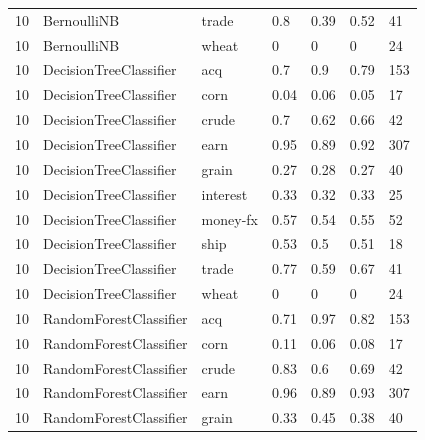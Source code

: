 \documentclass{article}
\begin{document}
\begin{table}[h]
\begin{tabular}{lllllll}
10            & BernoulliNB            & trade           & 0.8                & 0.39            & 0.52              & 41               \\
10            & BernoulliNB            & wheat           & 0                  & 0               & 0                 & 24               \\
10            & DecisionTreeClassifier & acq             & 0.7                & 0.9             & 0.79              & 153              \\
10            & DecisionTreeClassifier & corn            & 0.04               & 0.06            & 0.05              & 17               \\
10            & DecisionTreeClassifier & crude           & 0.7                & 0.62            & 0.66              & 42               \\
10            & DecisionTreeClassifier & earn            & 0.95               & 0.89            & 0.92              & 307              \\
10            & DecisionTreeClassifier & grain           & 0.27               & 0.28            & 0.27              & 40               \\
10            & DecisionTreeClassifier & interest        & 0.33               & 0.32            & 0.33              & 25               \\
10            & DecisionTreeClassifier & money-fx        & 0.57               & 0.54            & 0.55              & 52               \\
10            & DecisionTreeClassifier & ship            & 0.53               & 0.5             & 0.51              & 18               \\
10            & DecisionTreeClassifier & trade           & 0.77               & 0.59            & 0.67              & 41               \\
10            & DecisionTreeClassifier & wheat           & 0                  & 0               & 0                 & 24               \\
10            & RandomForestClassifier & acq             & 0.71               & 0.97            & 0.82              & 153              \\
10            & RandomForestClassifier & corn            & 0.11               & 0.06            & 0.08              & 17               \\
10            & RandomForestClassifier & crude           & 0.83               & 0.6             & 0.69              & 42               \\
10            & RandomForestClassifier & earn            & 0.96               & 0.89            & 0.93              & 307              \\
10            & RandomForestClassifier & grain           & 0.33               & 0.45            & 0.38              & 40               \\\end{tabular}
\end{table}
\end{document}
